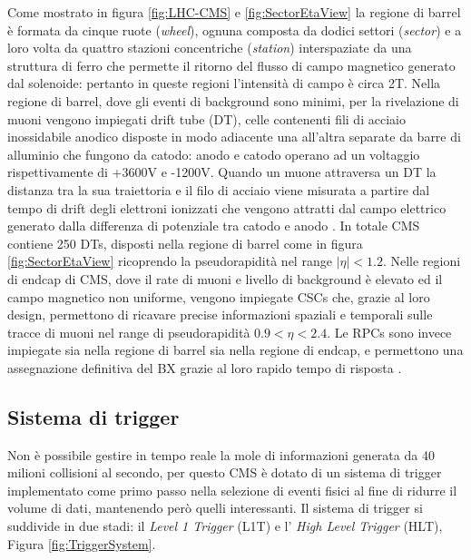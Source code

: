 Come mostrato in figura \ref{fig:LHC-CMS} e \ref{fig:SectorEtaView} la regione di barrel è formata da cinque ruote (\textit{wheel}), ognuna composta da dodici settori (\textit{sector}) e a loro volta da quattro stazioni concentriche (\textit{station}) interspaziate da una struttura di ferro che permette il ritorno del flusso di campo magnetico generato dal solenoide: pertanto in queste regioni l'intensità di campo è circa 2T. Nella regione di barrel, dove gli eventi di background sono minimi, per la rivelazione di muoni vengono impiegati drift tube (DT), celle contenenti fili di acciaio inossidabile anodico disposte in modo adiacente una all'altra separate da barre di alluminio che fungono da catodo: anodo e catodo operano ad un voltaggio rispettivamente di +3600V e -1200V. Quando un muone attraversa un DT la distanza tra la sua traiettoria e il filo di acciaio viene misurata a partire dal tempo di drift degli elettroni ionizzati che vengono attratti dal campo elettrico generato dalla differenza di potenziale tra catodo e anodo \cite{MasterThesisNicLai}. \newline
In totale CMS contiene 250 DTs, disposti nella regione di barrel come in figura \ref{fig:SectorEtaView} ricoprendo la pseudorapidità nel range $|\eta| < 1.2$. \newline
Nelle regioni di endcap di CMS, dove il rate di muoni e livello di background è elevato ed il campo magnetico non uniforme, vengono impiegate CSCs che, grazie al loro design, permettono di ricavare precise informazioni spaziali e temporali sulle tracce di muoni nel range di pseudorapidità $0.9 < \eta < 2.4$. Le RPCs sono invece impiegate sia nella regione di barrel sia nella regione di endcap, e permettono una assegnazione definitiva del BX grazie al loro rapido tempo di risposta \cite{MasterThesisNicLai, cms2008cms}.


\subsection{Sistema di trigger}
\label{sec:SistemaDiTrigger}

Non è possibile gestire in tempo reale la mole di informazioni generata da 40 milioni collisioni al secondo, per questo CMS è dotato di un sistema di trigger implementato come primo passo nella selezione di eventi fisici al fine di ridurre il volume di dati, mantenendo però quelli interessanti. Il sistema di trigger si suddivide in due stadi: il \textit{Level 1 Trigger} (L1T) e l' \textit{High Level Trigger} (HLT), Figura \ref{fig:TriggerSystem}. 

